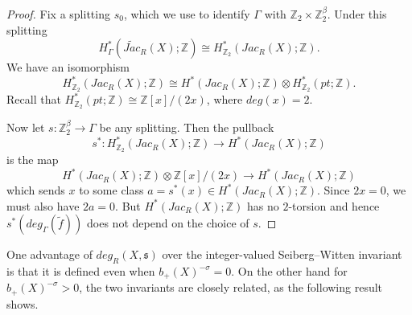 \documentclass{amsart}
\theoremstyle{definition}
\theoremstyle{remark}
\numberwithin{equation}{section}
\begin{document}
\begin{proof}
Fix a splitting $s_0$, which we use to identify $\Gamma$ with $\mathbb{Z}_2 \times \mathbb{Z}_2^\beta$. Under this splitting
\[
H^*_{\Gamma}(\widetilde{Jac}_R(X) ; \mathbb{Z}) \cong H^*_{\mathbb{Z}_2}( Jac_R(X) ; \mathbb{Z}).
\]
We have an isomorphism
\[
H^*_{\mathbb{Z}_2}( Jac_R(X) ; \mathbb{Z}) \cong H^*( Jac_R(X) ; \mathbb{Z}) \otimes H^*_{\mathbb{Z}_2}(pt ; \mathbb{Z}).
\]
Recall that $H^*_{\mathbb{Z}_2}(pt ; \mathbb{Z}) \cong \mathbb{Z}[x]/(2x)$, where $deg(x) = 2$.

Now let $s : \mathbb{Z}_2^\beta \to \Gamma$ be any splitting. Then the pullback
\[
s^* : H^*_{\mathbb{Z}_2}( Jac_R(X) ; \mathbb{Z}) \to H^*( Jac_R(X) ; \mathbb{Z})
\]
is the map
\[
H^*( Jac_R(X) ; \mathbb{Z}) \otimes \mathbb{Z}[x]/(2x) \to H^*(Jac_R(X) ; \mathbb{Z})
\]
which sends $x$ to some class $a = s^*(x) \in H^*(Jac_R(X) ; \mathbb{Z})$. Since $2x=0$, we must also have $2a=0$. But $H^*(Jac_R(X) ; \mathbb{Z})$ has no $2$-torsion and hence $s^*( deg_{\Gamma}(\widetilde{f}))$ does not depend on the choice of $s$.
\end{proof}

One advantage of $deg_R(X,\mathfrak{s})$ over the integer-valued Seiberg--Witten invariant is that it is defined even when $b_+(X)^{-\sigma} = 0$. On the other hand for $b_+(X)^{-\sigma} > 0$, the two invariants are closely related, as the following result shows.
\end{document}
